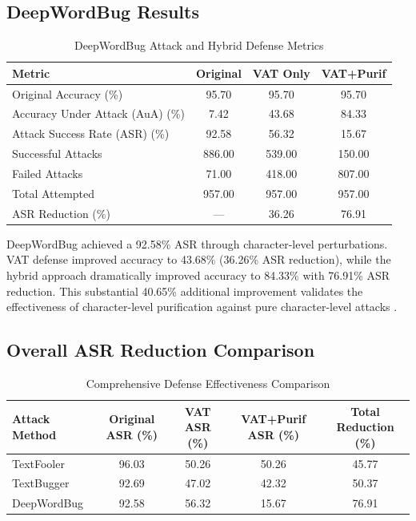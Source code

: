 \documentclass[../main.tex]{subfiles}
\begin{document}
\subsection{DeepWordBug Results}
\begin{table}[H]
\caption{DeepWordBug Attack and Hybrid Defense Metrics}
\label{tab:deepwordbug_results}
\centering
\footnotesize
\begin{tabular}{@{\hspace{0.3cm}}l*{3}{S[table-format=3.2]}@{\hspace{0.3cm}}}
\toprule
\textbf{Metric} & {\textbf{Original}} & {\textbf{VAT Only}} & {\textbf{VAT+Purif}} \\
\midrule
Original Accuracy (\%) & 95.70 & 95.70 & 95.70 \\
Accuracy Under Attack (AuA) (\%) & 7.42 & 43.68 & 84.33 \\
Attack Success Rate (ASR) (\%) & 92.58 & 56.32 & 15.67 \\
Successful Attacks & 886.00 & 539.00 & 150.00 \\
Failed Attacks & 71.00 & 418.00 & 807.00 \\
Total Attempted & 957.00 & 957.00 & 957.00 \\
ASR Reduction (\%) & {---} & 36.26 & 76.91 \\
\bottomrule
\end{tabular}
\end{table}

\FloatBarrier

DeepWordBug achieved a 92.58\% ASR through character-level perturbations. VAT defense improved accuracy to 43.68\% (36.26\% ASR reduction), while the hybrid approach dramatically improved accuracy to 84.33\% with 76.91\% ASR reduction. This substantial 40.65\% additional improvement validates the effectiveness of character-level purification against pure character-level attacks \cite{gao2018deepwordbug}.


\subsection{Overall ASR Reduction Comparison}
\begin{table}[H]
\caption{Comprehensive Defense Effectiveness Comparison}
\label{tab:asr_comparison}
\centering
\footnotesize
\begin{tabular}{@{\hspace{0.3cm}}l*{4}{S[table-format=2.2]}@{\hspace{0.3cm}}}
\toprule
\textbf{Attack Method} & {\textbf{Original ASR (\%)}} & {\textbf{VAT ASR (\%)}} & {\textbf{VAT+Purif ASR (\%)}} & {\textbf{Total Reduction (\%)}} \\
\midrule
TextFooler & 96.03 & 50.26 & 50.26 & 45.77 \\
TextBugger & 92.69 & 47.02 & 42.32 & 50.37 \\
DeepWordBug & 92.58 & 56.32 & 15.67 & 76.91 \\
\bottomrule
\end{tabular}
\end{table}
\FloatBarrier
\end{document}
